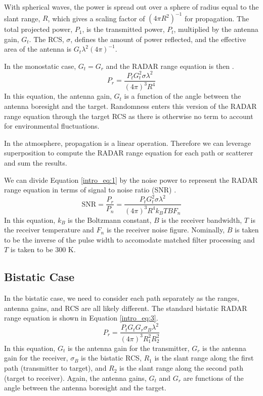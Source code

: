 With spherical waves, the power is spread out over a sphere of radius equal to the slant range, $R$, which gives a scaling factor of $\left( 4\pi R^2 \right)^{-1}$ for propagation. The total projected power, $P_1$, is the transmitted power, $P_t$, multiplied by the antenna gain, $G_t$. The RCS, $\sigma$, defines the amount of power reflected, and the effective area of the antenna is $G_t\lambda^2(4\pi)^{-1}$.

In the monostatic case, $G_t = G_r$ and the RADAR range equation is then \cite{skolnik_handbook}.
  \begin{equation}
  \label{intro_eq:1}
 P_r = \frac{P_tG_t^2\sigma\lambda^2}{\left(4\pi\right)^3R^4}
  \end{equation}
In this equation, the antenna gain, $G_t$ is a function of the angle between the antenna boresight and the target. Randomness enters this version of the RADAR range equation through the target RCS as there is otherwise no term to account for environmental fluctuations.

In the atmosphere, propagation is a linear operation. Therefore we can leverage superposition to compute the RADAR range equation for each path or scatterer and sum the results.

We can divide Equation \ref{intro_eq:1} by the noise power to represent the RADAR range equation in terms of signal to noise ratio (SNR) \cite{skolnik_handbook}.
\begin{equation}
    \label{intro_eq:2}
\text{SNR} = \frac{P_r}{P_n} = \frac{P_tG_t^2\sigma\lambda^2}{\left(4\pi\right)^3 R^4k_BTBF_n}
\end{equation}
In this equation, $k_B$ is the Boltzmann constant, $B$ is the receiver bandwidth, $T$ is the receiver temperature and $F_n$ is the receiver noise figure. Nominally, $B$ is taken to be the inverse of the pulse width to accomodate matched filter processing and $T$ is taken to be $300$ K.

\subsection{Bistatic Case}
In the bistatic case, we need to consider each path separately as the ranges, antenna gains, and RCS are all likely different. The standard bistatic RADAR range equation is shown in Equation \ref{intro_eq:3}.
  \begin{equation}
  \label{intro_eq:3}
 P_r = \frac{P_tG_tG_r\sigma_B\lambda^2}{\left(4\pi\right)^3R_1^2R_2^2}
  \end{equation}
In this equation, $G_t$ is the antenna gain for the transmitter, $G_r$ is the antenna gain for the receiver, $\sigma_B$ is the bistatic RCS, $R_1$ is the slant range along the first path (transmitter to target), and $R_2$ is the slant range along the second path (target to receiver). Again, the antenna gains, $G_t$ and $G_r$ are functions of the angle between the antenna boresight and the target.

